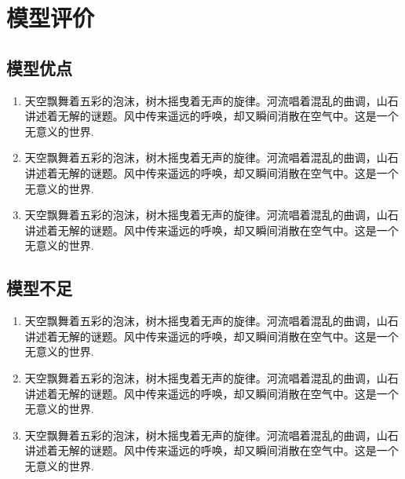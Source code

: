 
\section{模型评价}

\subsection{模型优点}

\begin{enumerate}[label=(\arabic*)]
  \item{天空飘舞着五彩的泡沫，树木摇曳着无声的旋律。河流唱着混乱的曲调，山石讲述着无解的谜题。风中传来遥远的呼唤，却又瞬间消散在空气中。这是一个无意义的世界.}
  \item{天空飘舞着五彩的泡沫，树木摇曳着无声的旋律。河流唱着混乱的曲调，山石讲述着无解的谜题。风中传来遥远的呼唤，却又瞬间消散在空气中。这是一个无意义的世界.}
  \item{天空飘舞着五彩的泡沫，树木摇曳着无声的旋律。河流唱着混乱的曲调，山石讲述着无解的谜题。风中传来遥远的呼唤，却又瞬间消散在空气中。这是一个无意义的世界.}
\end{enumerate}

\subsection{模型不足}

\begin{enumerate}[label=(\arabic*)]
  \item{天空飘舞着五彩的泡沫，树木摇曳着无声的旋律。河流唱着混乱的曲调，山石讲述着无解的谜题。风中传来遥远的呼唤，却又瞬间消散在空气中。这是一个无意义的世界.}
  \item{天空飘舞着五彩的泡沫，树木摇曳着无声的旋律。河流唱着混乱的曲调，山石讲述着无解的谜题。风中传来遥远的呼唤，却又瞬间消散在空气中。这是一个无意义的世界.}
  \item{天空飘舞着五彩的泡沫，树木摇曳着无声的旋律。河流唱着混乱的曲调，山石讲述着无解的谜题。风中传来遥远的呼唤，却又瞬间消散在空气中。这是一个无意义的世界.}
\end{enumerate}


